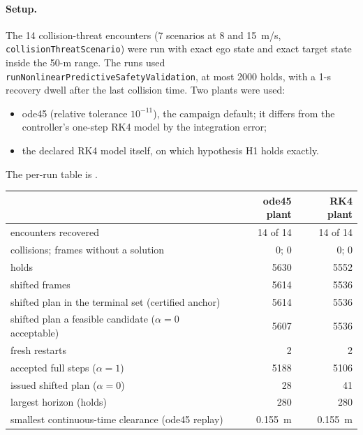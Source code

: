 \documentclass[11pt]{article}
\begin{document}
\paragraph{Setup.} The 14 collision-threat encounters (7 scenarios at 8 and
15~m/s, \texttt{collisionThreatScenario}) were run with exact ego state and
exact target state inside the 50-m range. The runs used
\texttt{runNonlinearPredictiveSafetyValidation}, at most 2000 holds, with a
1-s recovery dwell after the last collision time. Two plants were used:
\begin{itemize}
\item ode45 (relative tolerance $10^{-11}$), the campaign default; it differs
  from the controller's one-step RK4 model by the integration error;
\item the declared RK4 model itself, on which hypothesis H1 holds exactly.
\end{itemize}
The per-run table is .

\begin{center}
\begin{tabular}{lrr}
\toprule
 & ode45 plant & RK4 plant\\
\midrule
encounters recovered & 14 of 14 & 14 of 14\\
collisions; frames without a solution & 0; 0 & 0; 0\\
holds & 5630 & 5552\\
shifted frames & 5614 & 5536\\
shifted plan in the terminal set (certified anchor) & 5614 & 5536\\
shifted plan a feasible candidate ($\alpha=0$ acceptable) & 5607 & 5536\\
fresh restarts & 2 & 2\\
accepted full steps ($\alpha=1$) & 5188 & 5106\\
issued shifted plan ($\alpha=0$) & 28 & 41\\
largest horizon (holds) & 280 & 280\\
smallest continuous-time clearance (ode45 replay) & 0.155~m & 0.155~m\\
\bottomrule
\end{tabular}
\end{center}
\end{document}
